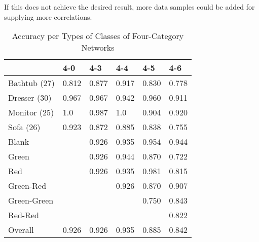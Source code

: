 If this does not achieve the desired result, more data samples could be added for supplying more correlations.
\begin{table}[]
	\centering
	\caption{Accuracy per Types of Classes of Four-Category Networks}
	\label{tab:four-category-accuracies}
	\begin{tabular}{l|lllll}
		            & 4-0   & 4-3   & 4-4   & 4-5   & 4-6   \\ \hline
		Bathtub (27)& 0.812 & 0.877 & 0.917 & 0.830 & 0.778 \\
		Dresser (30)& 0.967 & 0.967 & 0.942 & 0.960 & 0.911 \\
		Monitor (25)& 1.0   & 0.987 & 1.0   & 0.904 & 0.920 \\
		Sofa (26)   & 0.923 & 0.872 & 0.885 & 0.838 & 0.755 \\ \hline
		Blank       &       & 0.926 & 0.935 & 0.954 & 0.944 \\
		Green       &       & 0.926 & 0.944 & 0.870 & 0.722 \\
		Red         &       & 0.926 & 0.935 & 0.981 & 0.815 \\
		Green-Red   &       &       & 0.926 & 0.870 & 0.907 \\
		Green-Green &       &       &       & 0.750 & 0.843 \\
		Red-Red     &       &       &       &       & 0.822 \\ \hline
		Overall     & 0.926 & 0.926 & 0.935 & 0.885 & 0.842
	\end{tabular}
\end{table}
